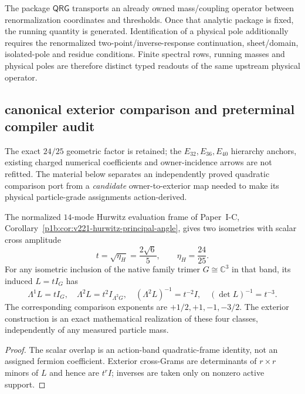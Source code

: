 \documentclass[11pt,a4paper]{article}
\begin{document}
\begin{remark}
\label{p6:rem:v236-qrg-pole-split}
The package \(\mathsf{QRG}\) transports an already owned mass/coupling operator
between renormalization coordinates and thresholds.  Once that analytic
package is fixed, the running quantity is generated.  Identification of a
physical pole additionally requires the renormalized two-point/inverse-response
continuation, sheet/domain, isolated-pole and residue conditions.  Finite
spectral rows, running masses and physical poles are therefore distinct typed
readouts of the same upstream physical operator.
\end{remark}


\subsection*{canonical exterior comparison and preterminal compiler audit}
\label{p6:sec:v5124-exterior-comparison-compiler-audit}
The exact $24/25$ geometric factor is retained; the $E_{32},E_{36},E_{40}$
hierarchy anchors, existing charged numerical coefficients and
owner-incidence arrows are not refitted.  The material below
separates an independently proved quadratic comparison port from a
\emph{candidate} owner-to-exterior map needed to make its physical
particle-grade assignments action-derived.

\begin{theorem}
\label{p6:thm:v5124-exterior-transfer}
The normalized $14$-mode Hurwitz evaluation frame of Paper~I-C,
Corollary~\ref{p1b:cor:v221-hurwitz-principal-angle}, gives two
isometries with scalar cross amplitude
\[
 t=\sqrt{\eta_H}=\frac{2\sqrt6}{5},\qquad\eta_H=\frac{24}{25}.
\]
For any isometric inclusion of the native family trimer
$G\cong\mathbb C^3$ in that band, its induced $L=tI_G$ has
\[
 \boxed{\Lambda^1L=tI_G,\quad
 \Lambda^2L=t^2I_{\Lambda^2G},\quad
 (\Lambda^2L)^{-1}=t^{-2}I,\quad
 (\det L)^{-1}=t^{-3}.}
\]
The corresponding comparison exponents are $+1/2,+1,-1,-3/2$.
The exterior construction is an exact mathematical realization
of these four classes, independently of any measured particle mass.
\end{theorem}
\begin{proof}
The scalar overlap is an action-band quadratic-frame identity,
not an assigned fermion coefficient.  Exterior cross-Grams are
determinants of $r\times r$ minors of $L$ and hence are $t^rI$;
inverses are taken only on nonzero active support.
\end{proof}
\end{document}
